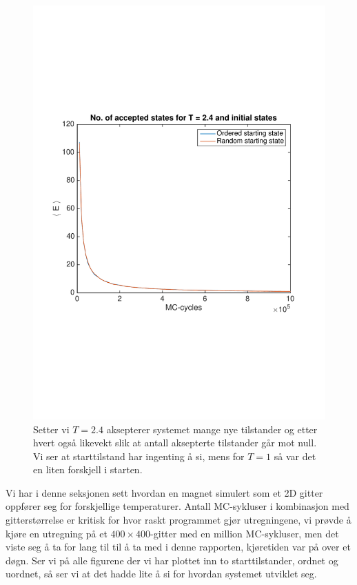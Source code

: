 \documentclass[norsk, 10pt]{article}
\begin{document}
\begin{figure}[H]
	\centering
	\includegraphics[scale = 0.5, trim = 1cm 8cm 1cm 8cm]{AccStatesL20T24.pdf}
	\caption{Setter vi $T=2.4$ aksepterer systemet mange nye tilstander og etter hvert også likevekt slik at antall aksepterte tilstander går mot null. Vi ser at starttilstand har ingenting å si, mens for $T=1$ så var det en liten forskjell i starten.}
	\label{fig:AccStatesL20T24}
\end{figure}

Vi har i denne seksjonen sett hvordan en magnet simulert som et 2D gitter oppfører seg for forskjellige temperaturer. Antall MC-sykluser i kombinasjon med gitterstørrelse er kritisk for hvor raskt programmet gjør utregningene, vi prøvde å kjøre en utregning på et $400\times 400$-gitter med en million MC-sykluser, men det viste seg å ta for lang til til å ta med i denne rapporten, kjøretiden var på over et døgn.  Ser vi på alle figurene der vi har plottet inn to starttilstander, ordnet og uordnet, så ser vi at det hadde lite å si for hvordan systemet utviklet seg.
\end{document}

